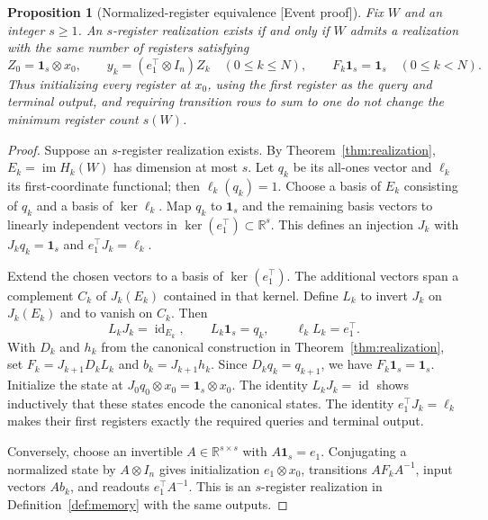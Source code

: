 \documentclass[11pt]{article}
\newcommand{\supportlabel}[1]{\textcolor{blue!60!black}{\small\textsf{[#1]}}}
\newcommand{\eventproof}{\supportlabel{Event proof}}
\numberwithin{equation}{section}
\newtheorem{proposition}[theorem]{Proposition}
\theoremstyle{definition}
\newcommand{\R}{\mathbb R}
\DeclareMathOperator{\im}{im}
\begin{document}
\begin{proposition}[Normalized-register equivalence \eventproof]\label{prop:normalized}
Fix $W$ and an integer $s\ge1$. An $s$-register realization exists if and only if
$W$ admits a realization with the same number of registers satisfying
\[
 Z_0=\mathbf1_s\otimes x_0,\qquad
 y_k=(e_1^\top\otimes I_n)Z_k\quad(0\le k\le N),\qquad
 F_k\mathbf1_s=\mathbf1_s\quad(0\le k<N).
\]
Thus initializing every register at $x_0$, using the first register as the query
and terminal output, and requiring transition rows to sum to one do not change
the minimum register count $s(W)$.
\end{proposition}
\begin{proof}
Suppose an $s$-register realization exists. By Theorem~\ref{thm:realization},
$E_k=\im H_k(W)$ has dimension at most $s$. Let $q_k$ be its all-ones vector
and $\ell_k$ its first-coordinate functional; then $\ell_k(q_k)=1$.
Choose a basis of $E_k$ consisting of $q_k$ and a basis of $\ker\ell_k$.
Map $q_k$ to $\mathbf1_s$ and the remaining basis vectors to linearly independent
vectors in $\ker(e_1^\top)\subset\R^s$. This defines an injection $J_k$ with
$J_kq_k=\mathbf1_s$ and $e_1^\top J_k=\ell_k$.

Extend the chosen vectors to a basis of $\ker(e_1^\top)$. The additional
vectors span a complement $C_k$ of $J_k(E_k)$ contained in that kernel.
Define $L_k$ to invert $J_k$ on $J_k(E_k)$ and to vanish on $C_k$. Then
\[
 L_kJ_k=\operatorname{id}_{E_k},\qquad
 L_k\mathbf1_s=q_k,\qquad \ell_kL_k=e_1^\top.
\]
With $D_k$ and $h_k$ from the canonical construction in
Theorem~\ref{thm:realization}, set $F_k=J_{k+1}D_kL_k$ and $b_k=J_{k+1}h_k$.
Since $D_kq_k=q_{k+1}$, we have $F_k\mathbf1_s=\mathbf1_s$.
Initialize the state at $J_0q_0\otimes x_0=\mathbf1_s\otimes x_0$.
The identity $L_kJ_k=\operatorname{id}$ shows inductively that these states
encode the canonical states. The identity $e_1^\top J_k=\ell_k$ makes their
first registers exactly the required queries and terminal output.

Conversely, choose an invertible $A\in\R^{s\times s}$ with
$A\mathbf1_s=e_1$. Conjugating a normalized state by $A\otimes I_n$ gives
initialization $e_1\otimes x_0$, transitions $AF_kA^{-1}$, input vectors
$Ab_k$, and readouts $e_1^\top A^{-1}$. This is an $s$-register realization
in Definition~\ref{def:memory} with the same outputs.
\end{proof}
\end{document}
